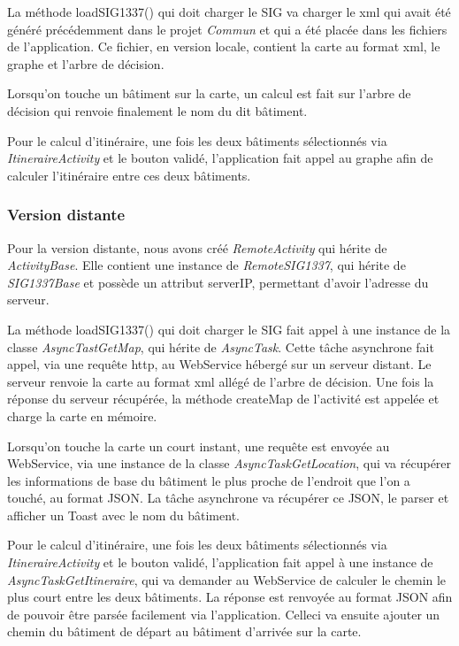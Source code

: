 La méthode loadSIG1337() qui doit charger le SIG va charger le xml qui avait été généré précédemment dans le projet \textit{Commun}
et qui a été placée dans les fichiers de l'application.
Ce fichier, en version locale, contient la carte au format xml, le graphe et l'arbre de décision.

Lorsqu'on touche un bâtiment sur la carte, un calcul est fait sur l'arbre de décision qui renvoie finalement le nom du dit bâtiment.

Pour le calcul d'itinéraire, une fois les deux bâtiments sélectionnés via \textit{ItineraireActivity} et le bouton validé,
l'application fait appel au graphe afin de calculer l'itinéraire entre ces deux bâtiments.


\subsubsection{Version distante}

Pour la version distante, nous avons créé \textit{RemoteActivity} qui hérite de \textit{ActivityBase}.
Elle contient une instance de \textit{RemoteSIG1337}, qui hérite de \textit{SIG1337Base} et possède un attribut serverIP,
permettant d'avoir l'adresse du serveur.

La méthode loadSIG1337() qui doit charger le SIG fait appel à une instance de la classe \textit{AsyncTastGetMap},
qui hérite de \textit{AsyncTask}.
Cette tâche asynchrone fait appel, via une requête http, au WebService hébergé sur un serveur distant.
Le serveur renvoie la carte au format xml allégé de l'arbre de décision.
Une fois la réponse du serveur récupérée, la méthode createMap de l'activité est appelée et charge la carte en mémoire.

Lorsqu'on touche la carte un court instant, une requête est envoyée au WebService,
via une instance de la classe \textit{AsyncTaskGetLocation},
qui va récupérer les informations de base du bâtiment le plus proche de l'endroit que l'on a touché, au format JSON.
La tâche asynchrone va récupérer ce JSON, le parser et afficher un Toast avec le nom du bâtiment.

Pour le calcul d'itinéraire, une fois les deux bâtiments sélectionnés via \textit{ItineraireActivity} et le bouton validé,
l'application fait appel à une instance de \textit{AsyncTaskGetItineraire},
qui va demander au WebService de calculer le chemin le plus court entre les deux bâtiments.
La réponse est renvoyée au format JSON afin de pouvoir être parsée facilement via l'application.
Celle\-ci va ensuite ajouter un chemin du bâtiment de départ au bâtiment d'arrivée sur la carte.


